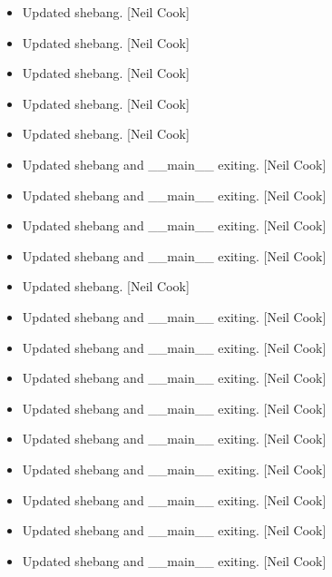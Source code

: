 \documentclass[a4paper,10pt,english]{report}
\begin{document}
\begin{itemize}
\item {} 
Updated shebang. {[}Neil Cook{]}

\item {} 
Updated shebang. {[}Neil Cook{]}

\item {} 
Updated shebang. {[}Neil Cook{]}

\item {} 
Updated shebang. {[}Neil Cook{]}

\item {} 
Updated shebang. {[}Neil Cook{]}

\item {} 
Updated shebang and \_\_main\_\_ exiting. {[}Neil Cook{]}

\item {} 
Updated shebang and \_\_main\_\_ exiting. {[}Neil Cook{]}

\item {} 
Updated shebang and \_\_main\_\_ exiting. {[}Neil Cook{]}

\item {} 
Updated shebang and \_\_main\_\_ exiting. {[}Neil Cook{]}

\item {} 
Updated shebang. {[}Neil Cook{]}

\item {} 
Updated shebang and \_\_main\_\_ exiting. {[}Neil Cook{]}

\item {} 
Updated shebang and \_\_main\_\_ exiting. {[}Neil Cook{]}

\item {} 
Updated shebang and \_\_main\_\_ exiting. {[}Neil Cook{]}

\item {} 
Updated shebang and \_\_main\_\_ exiting. {[}Neil Cook{]}

\item {} 
Updated shebang and \_\_main\_\_ exiting. {[}Neil Cook{]}

\item {} 
Updated shebang and \_\_main\_\_ exiting. {[}Neil Cook{]}

\item {} 
Updated shebang and \_\_main\_\_ exiting. {[}Neil Cook{]}

\item {} 
Updated shebang and \_\_main\_\_ exiting. {[}Neil Cook{]}

\item {} 
Updated shebang and \_\_main\_\_ exiting. {[}Neil Cook{]}

\end{itemize}
\end{document}
